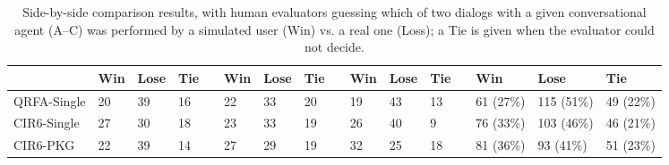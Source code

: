 \begin{table*}[t]
	\caption{Side-by-side comparison results, with human evaluators guessing which of two dialogs with a given conversational agent (A--C) was performed by a simulated user (Win) vs. a real one (Loss); a Tie is given when the evaluator could not decide.}
	\captionshrink
	\begin{tabular}{llllllllllllllll}
	\toprule
	 	  & \textbf{Win} & \textbf{Lose} & \textbf{Tie} &&\textbf{Win} & \textbf{Lose} & \textbf{Tie} && \textbf{Win} & \textbf{Lose} & \textbf{Tie}  && \textbf{Win} & \textbf{Lose} & \textbf{Tie}\\
	\midrule
	 QRFA-Single & 20 & 39 & 16 && 22 & 33 & 20 && 19 & 43 & 13 && 61 (27\%) & 115 (51\%) & 49 (22\%) \\
	 CIR6-Single & 27 & 30 & 18 && 23 & 33 & 19 && 26 & 40 & 9 && 76 (33\%) & 103 (46\%) & 46 (21\%) \\
	 CIR6-PKG  & 22 & 39 & 14 && 27 & 29 & 19 && 32 & 25 & 18 && 81 (36\%) & 93 (41\%) & 51 (23\%) \\
	\bottomrule
	\end{tabular}
	\shrink
\label{tbl:human}
\end{table*}